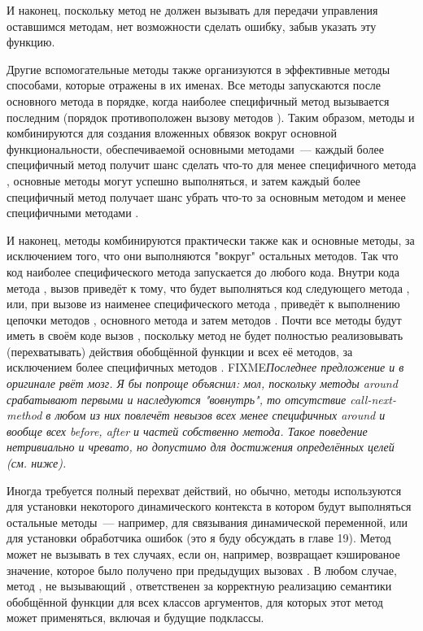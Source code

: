 И наконец, поскольку метод  не должен вызывать  для
передачи управления оставшимся методам, нет возможности сделать ошибку, забыв указать эту
функцию.

Другие вспомогательные методы также организуются в эффективные методы способами, которые
отражены в их именах.  Все методы  запускаются после основного метода в
порядке, когда наиболее специфичный метод вызывается последним (порядок противоположен
вызову методов ).  Таким образом, методы  и 
комбинируются для создания вложенных обвязок вокруг основной функциональности,
обеспечиваемой основными методами~--- каждый более специфичный метод  получит
шанс сделать что-то для менее специфичного метода , основные методы могут
успешно выполняться, и затем каждый более специфичный метод  получает шанс
убрать что-то за основным методом и менее специфичными методами .

И наконец, методы  комбинируются практически также как и основные методы, за
исключением того, что они выполняются "вокруг" остальных методов. Так что код наиболее
специфического метода  запускается до любого кода. Внутри кода метода
, вызов  приведёт к тому, что будет выполняться код
следующего метода , или, при вызове из наименее специфического метода
, приведёт к выполнению цепочки методов , основного метода и
затем методов .  Почти все методы  будут иметь в своём коде
вызов , поскольку метод  не будет полностью
реализовывать (перехватывать) действия обобщённой функции и всех её методов, за
исключением более специфичных методов . FIXME\textit{Последнее предложение и
  в оригинале рвёт мозг. Я бы попроще объяснил: мол, поскольку методы around срабатывают
  первыми и наследуются "вовнутрь", то отсутствие call-next-method в любом из них повлечёт
  невызов всех менее специфичных around и вообще всех before, after и частей собственно
  метода. Такое поведение нетривиально и чревато, но допустимо для достижения определённых
  целей (см. ниже).}

Иногда требуется полный перехват действий, но обычно, методы  используются
для установки некоторого динамического контекста в котором будут выполняться остальные
методы~--- например, для связывания динамической переменной, или для установки обработчика
ошибок (это я буду обсуждать в главе 19).  Метод  может не вызывать
 в тех случаях, если он, например, возвращает кэшированое значение,
которое было получено при предыдущих вызовах .  В любом случае,
метод , не вызывающий , ответственен за корректную
реализацию семантики обобщённой функции для всех классов аргументов, для которых этот
метод может применяться, включая и будущие подклассы.

